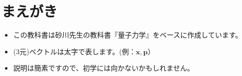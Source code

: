 \chapter{まえがき}
\begin{itemize}
	\item この教科書は砂川先生の教科書『量子力学』をベースに作成しています。
	\item (3元)ベクトルは太字で表します。(例：$\bm{x}, \bm{p}$）	 
	\item 説明は簡素ですので、初学には向かないかもしれません。
\end{itemize}